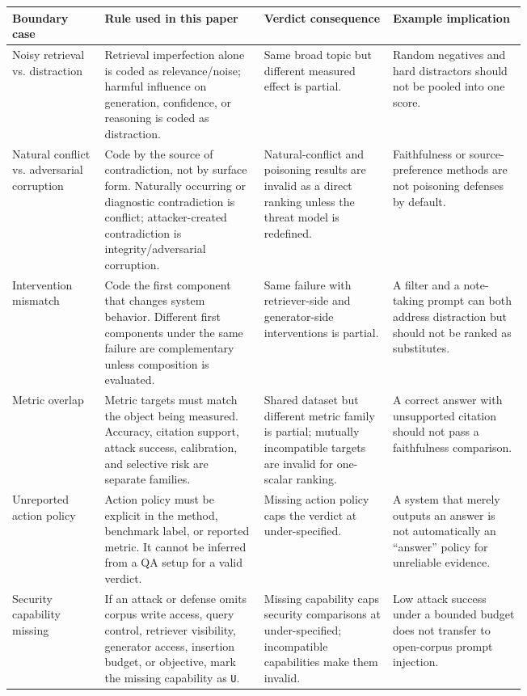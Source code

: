 \documentclass[11pt]{article}
\begin{document}
\begin{table}[t]
\centering
\scriptsize
\renewcommand{\arraystretch}{0.88}
\begin{tabularx}{\linewidth}{>{\raggedright\arraybackslash}p{0.18\linewidth}>{\raggedright\arraybackslash}p{0.31\linewidth}>{\raggedright\arraybackslash}p{0.25\linewidth}X}
\toprule
\textbf{Boundary case} & \textbf{Rule used in this paper} & \textbf{Verdict consequence} & \textbf{Example implication} \\
\midrule
Noisy retrieval vs. distraction & Retrieval imperfection alone is coded as relevance/noise; harmful influence on generation, confidence, or reasoning is coded as distraction. & Same broad topic but different measured effect is partial. & Random negatives and hard distractors should not be pooled into one score. \\
Natural conflict vs. adversarial corruption & Code by the source of contradiction, not by surface form. Naturally occurring or diagnostic contradiction is conflict; attacker-created contradiction is integrity/adversarial corruption. & Natural-conflict and poisoning results are invalid as a direct ranking unless the threat model is redefined. & Faithfulness or source-preference methods are not poisoning defenses by default. \\
Intervention mismatch & Code the first component that changes system behavior. Different first components under the same failure are complementary unless composition is evaluated. & Same failure with retriever-side and generator-side interventions is partial. & A filter and a note-taking prompt can both address distraction but should not be ranked as substitutes. \\
Metric overlap & Metric targets must match the object being measured. Accuracy, citation support, attack success, calibration, and selective risk are separate families. & Shared dataset but different metric family is partial; mutually incompatible targets are invalid for one-scalar ranking. & A correct answer with unsupported citation should not pass a faithfulness comparison. \\
Unreported action policy & Action policy must be explicit in the method, benchmark label, or reported metric. It cannot be inferred from a QA setup for a valid verdict. & Missing action policy caps the verdict at under-specified. & A system that merely outputs an answer is not automatically an ``answer'' policy for unreliable evidence. \\
Security capability missing & If an attack or defense omits corpus write access, query control, retriever visibility, generator access, insertion budget, or objective, mark the missing capability as \texttt{U}. & Missing capability caps security comparisons at under-specified; incompatible capabilities make them invalid. & Low attack success under a bounded budget does not transfer to open-corpus prompt injection. \\

\end{tabularx}
\end{table}
\end{document}

